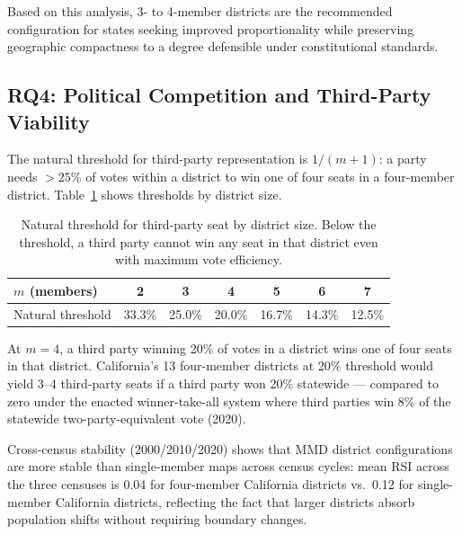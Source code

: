 Based on this analysis, 3- to 4-member districts are the recommended configuration for states seeking improved proportionality while preserving geographic compactness to a degree defensible under constitutional standards.

\subsection{RQ4: Political Competition and Third-Party Viability}

The natural threshold for third-party representation is $1/(m+1)$: a party needs $> 25\%$ of votes within a district to win one of four seats in a four-member district. Table~\ref{tab:mmid-threshold} shows thresholds by district size.

\begin{table}[h]
\centering\small
\caption{Natural threshold for third-party seat by district size. Below the threshold, a third party cannot win any seat in that district even with maximum vote efficiency.}
\label{tab:mmid-threshold}
\begin{tabular}{lcccccc}
\toprule
$m$ (members) & 2 & 3 & 4 & 5 & 6 & 7 \\
\midrule
Natural threshold & 33.3\% & 25.0\% & 20.0\% & 16.7\% & 14.3\% & 12.5\% \\
\bottomrule
\end{tabular}
\end{table}

At $m=4$, a third party winning 20\% of votes in a district wins one of four seats in that district. California's 13 four-member districts at 20\% threshold would yield 3--4 third-party seats if a third party won 20\% statewide — compared to zero under the enacted winner-take-all system where third parties win 8\% of the statewide two-party-equivalent vote (2020).

Cross-census stability (2000/2010/2020) shows that MMD district configurations are more stable than single-member maps across census cycles: mean RSI across the three censuses is 0.04 for four-member California districts vs.\ 0.12 for single-member California districts, reflecting the fact that larger districts absorb population shifts without requiring boundary changes.
